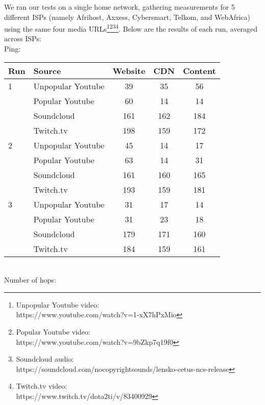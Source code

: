 \documentclass{sig-alternate-05-2015}
\begin{document}
We ran our tests on a single home network, gathering measurements for 5 different ISPs (namely Afrihost, Axxess, Cybersmart, Telkom, and WebAfrica) using the same four media URLs\footnote{Unpopular Youtube video: \\ https://www.youtube.com/watch?v=1-xX7hPxMio}\footnote{Popular Youtube video: \\ https://www.youtube.com/watch?v=9bZkp7q19f0}\footnote{Soundcloud audio: \\ https://soundcloud.com/nocopyrightsounds/lensko-cetus-ncs-release}\footnote{Twitch.tv video: \\https://www.twitch.tv/dota2ti/v/83400929}.
Below are the results of each run, averaged across ISPs:
\vspace{1em} \\
Ping: \\
\begin{tabular}{|l|l|c|c|c|} \hline
Run & Source & Website & CDN & Content \\ \hline
1 & Unpopular Youtube & 39  & 35  & 56  \\ \hline
  & Popular Youtube   & 60  & 14  & 14  \\ \hline
  & Soundcloud        & 161 & 162 & 184 \\ \hline
  & Twitch.tv         & 198 & 159 & 172 \\ \hline
2 & Unpopular Youtube & 45  & 14  & 17  \\ \hline
  & Popular Youtube   & 63  & 14  & 31  \\ \hline
  & Soundcloud        & 161 & 160 & 165 \\ \hline
  & Twitch.tv         & 193 & 159 & 181 \\ \hline
3 & Unpopular Youtube & 31  & 17  & 14  \\ \hline
  & Popular Youtube   & 31  & 23  & 18  \\ \hline
  & Soundcloud        & 179 & 171 & 160 \\ \hline
  & Twitch.tv         & 184 & 159 & 161 \\ \hline
\end{tabular}
\vspace{1em} \\
Number of hops: \\
\end{document}
